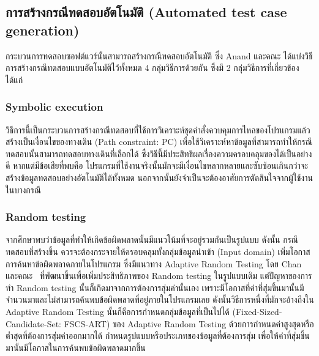 \subsection{การสร้างกรณีทดสอบอัตโนมัติ (Automated test case generation)}
\label{sub:tcgen}

กระบวนการทดสอบซอฟต์แวร์นั้นสามารถสร้างกรณีทดสอบอัตโนมัติ ซึ่ง Anand และคณะ \cite{Anand2013} ได้แบ่งวิธีการสร้างกรณีทดสอบแบบอัตโนมัติไว้ทั้งหมด 
4 กลุ่มวิธีการด้วยกัน ซึ่งมี 2 กลุ่มวิธีการที่เกี่ยวข้องได้แก่

\subsubsection{Symbolic execution}
\label{sub:tcgen:sub:symbolic}

วิธีการนี้เป็นกระบวนการสร้างกรณีทดสอบที่ใช้การวิเคราะห์ชุดคำสั่งควบคุมการไหลของโปรแกรมแล้วสร้างเป็นเงื่อนไขของทางเดิน (Path constraint: PC) 
เพื่อใช้วิเคราะห์หาข้อมูลที่สามารถทำให้กรณีทดสอบนั้นสามารถทดสอบทางเดินที่เลือกได้ ซึ่งวิธีนี้มีประสิทธิผลเรื่องความครอบคลุมของ{\sourcecode}ได้เป็นอย่างดี
หากแต่มีข้อเสียที่พบคือ โปรแกรมที่ใช้งานจริงนั้นมักจะมีเงื่อนไขหลากหลายและซับซ้อนเกินกว่าจะสร้างข้อมูลทดสอบอย่างอัตโนมัติได้ทั้งหมด 
นอกจากนั้นยังจำเป็นจะต้องอาศัยการตัดสินใจจากผู้ใช้งานในบางกรณี

\subsubsection{Random testing}
\label{sub:tcgen:sub:random}

จากศึกษาพบว่าข้อมูลที่ทำให้เกิดข้อผิดพลาดนั้นมีแนวโน้มที่จะอยู่รวมกันเป็นรูปแบบ %
ดังนั้น กรณีทดสอบที่สร้างขึ้น
ควรจะต้องกระจายให้ครอบคลุมทั้งกลุ่มข้อมูลนำเข้า (Input domain) เพิ่มโอกาสการค้นหาข้อผิดพลาดภายในโปรแกรม ซึ่งมีแนวทาง Adaptive Random Testing
โดย Chan และคณะ \cite{Chan2004}\ ที่พัฒนาขึ้นเพื่อเพิ่มประสิทธิภาพของ Random testing ในรูปแบบเดิม แต่ปัญหาของการทำ Random testing
นั้นก็เกิดมาจากการต้องการสุ่มค่านั้นเอง เพราะมีโอกาสที่ค่าที่สุ่มขึ้นมานั้นมีจำนวนมาและไม่สามารถค้นพบข้อผิดพลาดที่อยู่ภายในโปรแกรมเลย 
ดังนั้นวิธีการหนึ่งที่มักจะอ้างถึงใน Adaptive Random Testing นั้นก็คือการกำหนดกลุ่มข้อมูลที่เป็นไปได้ (Fixed-Sized-Candidate-Set: FSCS-ART) 
ของ Adaptive Random Testing ด้วยการกำหนดค่าสูงสุดหรือต่ำสุดที่ต้องการสุ่มค่าออกมากได้ กำหนดรูปแบบหรือประเภทของข้อมูลที่ต้องการสุ่ม 
เพื่อให้ค่าที่สุ่มขึ้นมานั้นมีโอกาสในการค้นพบข้อผิดพลาดมากขึ้น %
